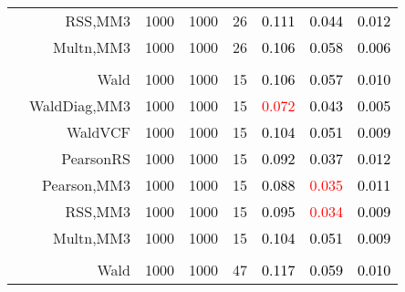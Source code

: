 \documentclass[
]{article}
\begin{document}
\begin{table}[H]
{\begin{tabular}[t]{lrrrrrrr}
\hspace{1em} & RSS,MM3 & 1000 & 1000 & 26 & \textcolor{black}{0.111} & \textcolor{black}{0.044} & \textcolor{black}{0.012}\\

\hspace{1em} & Multn,MM3 & 1000 & 1000 & 26 & \textcolor{black}{0.106} & \textcolor{black}{0.058} & \textcolor{black}{0.006}\\
\cmidrule{1-8}
\addlinespace[0.3em]
\multicolumn{8}{l}{\textbf{2F 10V}}\\
\hspace{1em} & Wald & 1000 & 1000 & 15 & \textcolor{black}{0.106} & \textcolor{black}{0.057} & \textcolor{black}{0.010}\\

\hspace{1em} & WaldDiag,MM3 & 1000 & 1000 & 15 & \textcolor{red}{0.072} & \textcolor{black}{0.043} & \textcolor{black}{0.005}\\

\hspace{1em} & WaldVCF & 1000 & 1000 & 15 & \textcolor{black}{0.104} & \textcolor{black}{0.051} & \textcolor{black}{0.009}\\

\hspace{1em} & PearsonRS & 1000 & 1000 & 15 & \textcolor{black}{0.092} & \textcolor{black}{0.037} & \textcolor{black}{0.012}\\

\hspace{1em} & Pearson,MM3 & 1000 & 1000 & 15 & \textcolor{black}{0.088} & \textcolor{red}{0.035} & \textcolor{black}{0.011}\\

\hspace{1em} & RSS,MM3 & 1000 & 1000 & 15 & \textcolor{black}{0.095} & \textcolor{red}{0.034} & \textcolor{black}{0.009}\\

\hspace{1em} & Multn,MM3 & 1000 & 1000 & 15 & \textcolor{black}{0.104} & \textcolor{black}{0.051} & \textcolor{black}{0.009}\\
\cmidrule{1-8}
\addlinespace[0.3em]
\multicolumn{8}{l}{\textbf{3F 15V}}\\
\hspace{1em} & Wald & 1000 & 1000 & 47 & \textcolor{black}{0.117} & \textcolor{black}{0.059} & \textcolor{black}{0.010}\\


\end{tabular}}
\end{table}
\end{document}
